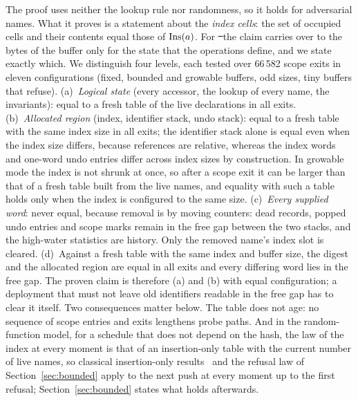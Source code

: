 The proof uses neither the lookup rule nor randomness, so it holds for adversarial names. What it proves is a statement about the \emph{index cells}: the set of occupied cells and their contents equal those of $\mathrm{Ins}(a)$. For \st\ the claim carries over to the bytes of the buffer only for the state that the operations define, and we state exactly which. We distinguish four levels, each tested over 66\,582 scope exits in eleven configurations (fixed, bounded and growable buffers, odd sizes, tiny buffers that refuse). (a)~\emph{Logical state} (every accessor, the lookup of every name, the invariants): equal to a fresh table of the live declarations in all exits. (b)~\emph{Allocated region} (index, identifier stack, undo stack): equal to a fresh table with the same index size in all exits; the identifier stack alone is equal even when the index size differs, because references are relative, whereas the index words and one-word undo entries differ across index sizes by construction. In growable mode the index is not shrunk at once, so after a scope exit it can be larger than that of a fresh table built from the live names, and equality with such a table holds only when the index is configured to the same size. (c)~\emph{Every supplied word}: never equal, because removal is by moving counters: dead records, popped undo entries and scope marks remain in the free gap between the two stacks, and the high-water statistics are history. Only the removed name's index slot is cleared. (d)~Against a fresh table with the same index and buffer size, the digest and the allocated region are equal in all exits and every differing word lies in the free gap. The proven claim is therefore (a) and (b) with equal configuration; a deployment that must not leave old identifiers readable in the free gap has to clear it itself. Two consequences matter below. The table does not age: no sequence of scope entries and exits lengthens probe paths. And in the random-function model, for a schedule that does not depend on the hash, the law of the index at every moment is that of an insertion-only table with the current number of live names, so classical insertion-only results~\cite{knuth3,janson2005} and the refusal law of Section~\ref{sec:bounded} apply to the next push at every moment up to the first refusal; Section~\ref{sec:bounded} states what holds afterwards.


